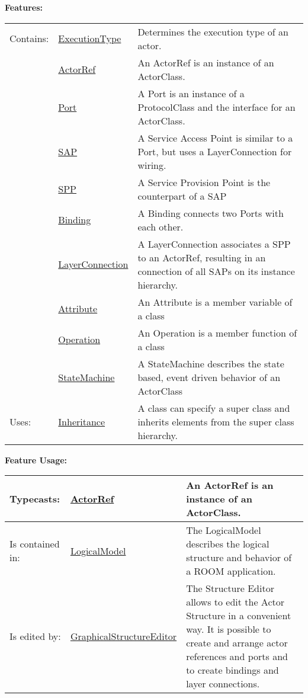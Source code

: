 		\begingroup
		\textbf{Features:}
		\renewcommand{\arraystretch}{1.8} %
		\begin{longtable}{l|l p{}}
			\hline
		Contains: & \tabitem \hyperlink{ref:ExecutionType}{ExecutionType}  & Determines the execution type of an actor.\\
		& \tabitem \hyperlink{ref:ActorRef}{ActorRef}  & An ActorRef is an instance of an ActorClass. \\
		& \tabitem \hyperlink{ref:Port}{Port}  & A Port is an instance of a ProtocolClass and the interface for an ActorClass. \\
		& \tabitem \hyperlink{ref:SAP}{SAP}  & A Service Access Point is similar to a Port, but uses a LayerConnection for wiring. \\
		& \tabitem \hyperlink{ref:SPP}{SPP}  & A Service Provision Point is the counterpart of a SAP \\
		& \tabitem \hyperlink{ref:Binding}{Binding}  & A Binding connects two Ports with each other. \\
		& \tabitem \hyperlink{ref:LayerConnection}{LayerConnection}  & A LayerConnection associates a SPP to an ActorRef, resulting in an connection of all SAPs on its instance hierarchy. \\
		& \tabitem \hyperlink{ref:Attribute}{Attribute}  & An Attribute is a member variable of a class \\
		& \tabitem \hyperlink{ref:Operation}{Operation}  & An Operation is a member function of a class \\
		& \tabitem \hyperlink{ref:StateMachine}{StateMachine}  & A StateMachine describes the state based, event driven behavior of an ActorClass \\
		\hline
		Uses: & \tabitem \hyperlink{ref:Inheritance}{Inheritance}  & A class can specify a super class and inherits elements from the super class hierarchy.\\
		\hline
		\end{longtable}
		\endgroup
		
		\begingroup
		\textbf{Feature Usage:}
		\renewcommand{\arraystretch}{1.8} %
		\begin{longtable}{l|l p{}}
			\hline
		Typecasts: & \tabitem \hyperlink{ref:ActorRef}{ActorRef}  & An ActorRef is an instance of an ActorClass.\\
		\hline
		Is contained in: & \tabitem \hyperlink{ref:LogicalModel}{LogicalModel}  & The LogicalModel describes the logical structure and behavior of a ROOM application.\\
		\hline
		Is edited by: & \tabitem \hyperlink{ref:GraphicalStructureEditor}{GraphicalStructureEditor}  & The Structure Editor allows to edit the Actor Structure in a convenient way. It is possible to create and arrange actor references and ports and to create bindings and layer connections.\\
		\hline
		\end{longtable}
		\endgroup
		
